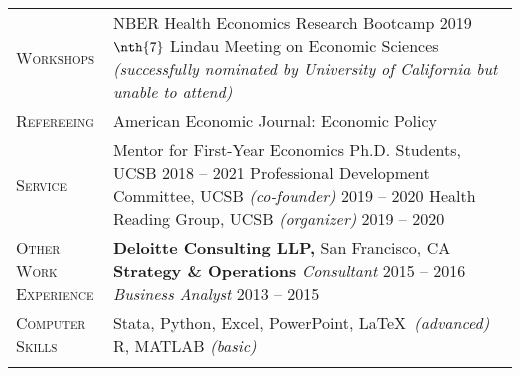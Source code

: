 \documentclass[11pt]{article}
\begin{document}
\begin{tabularx}{\textwidth}{@{}Y Z@{}}
	\textsc{Workshops} & 
	NBER Health Economics Research Bootcamp \hfill 2019%
	\vspace{6pt} \newline
	$\nth{7}$ Lindau Meeting on Economic Sciences \newline \textit{(successfully nominated by University of California but unable to attend)} 
	\\ \addlinespace[20pt] 
	
	\textsc{Refereeing}  & 
	American Economic Journal: Economic Policy
	 \\ \addlinespace[20pt] 
	
	\textsc{Service} & 
	Mentor for First-Year Economics Ph.D. Students, UCSB \hfill 2018 -- 2021%
	\vspace{3pt} \newline
	Professional Development Committee, UCSB \textit{(co-founder)}  \hfill 2019 -- 2020%
	\vspace{3pt} \newline
	Health Reading Group, UCSB \textit{(organizer)} \hfill 2019 -- 2020%
	\\ \addlinespace[20pt] 
	

	\textsc{Other Work \newline Experience}  & 
	\textbf{Deloitte Consulting LLP,} San Francisco, CA
	\vspace{0pt} \newline
	\textbf{Strategy \& Operations} 
	\vspace{3pt} \newline
	\textit{Consultant} \hfill 2015 -- 2016%
	\vspace{0pt} \newline
	\textit{Business Analyst} \hfill 2013 -- 2015%
	\\ \newpage
	
	\textsc{Computer  \vspace*{3pt} \newline Skills}  & 
	Stata, Python, Excel, PowerPoint, \LaTeX \ \textit{(advanced)}
	\vspace{3pt} \newline
	R, MATLAB \textit{(basic)}
	\\ \addlinespace[20pt] 
	

\end{tabularx}
\end{document}
